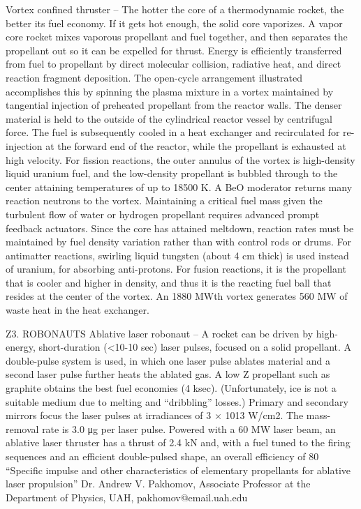 \documentclass[a4paper]{book}
\begin{document}
Vortex confined thruster – The hotter the core of a thermodynamic rocket, the better its fuel economy. If it gets hot enough, the solid core vaporizes. A vapor core rocket mixes vaporous propellant and fuel together, and then separates the propellant out so it can be expelled for thrust. Energy is efficiently transferred from fuel to propellant by direct molecular collision, radiative heat, and direct reaction fragment deposition.  The open-cycle arrangement illustrated accomplishes this by spinning the plasma mixture in a vortex maintained by tangential injection of preheated propellant from the reactor walls. The denser material is held to the outside of the cylindrical reactor vessel by centrifugal force.  The fuel is subsequently cooled in a heat exchanger and recirculated for re-injection at the forward end of the reactor, while the propellant is exhausted at high velocity. For fission reactions, the outer annulus of the vortex is high-density liquid uranium fuel, and the low-density propellant is bubbled through to the center attaining temperatures of up to 18500 K.  A BeO moderator returns many reaction neutrons to the vortex.  Maintaining a critical fuel mass given the turbulent flow of water or hydrogen propellant requires advanced prompt feedback actuators. Since the core has attained meltdown, reaction rates must be maintained by fuel density variation rather than with control rods or drums.  For antimatter reactions, swirling liquid tungsten (about 4 cm thick) is used instead of uranium, for absorbing anti-protons.  For fusion reactions, it is the propellant that is cooler and higher in density, and thus it is the reacting fuel ball that resides at the center of the vortex.  An 1880 MWth vortex generates 560 MW of waste heat in the heat exchanger.  
 

Z3. ROBONAUTS
Ablative laser robonaut – A rocket can be driven by high-energy, short-duration (<10-10 sec) laser pulses, focused on a solid propellant. A double-pulse system is used, in which one laser pulse ablates material and a second laser pulse further heats the ablated gas. A low Z propellant such as graphite obtains the best fuel economies (4 ksec).  (Unfortunately, ice is not a suitable medium due to melting and “dribbling” losses.) Primary and secondary mirrors focus the laser pulses at irradiances of 3 × 1013 W/cm2. The mass-removal rate is 3.0 μg per laser pulse.  Powered with a 60 MW laser beam, an ablative laser thruster has a thrust of 2.4 kN and, with a fuel tuned to the firing sequences and an efficient double-pulsed shape, an overall efficiency of 80%
 “Specific impulse and other characteristics of elementary propellants for ablative laser propulsion” Dr. Andrew V. Pakhomov, Associate Professor at the Department of Physics, UAH, pakhomov@email.uah.edu
\end{document}
